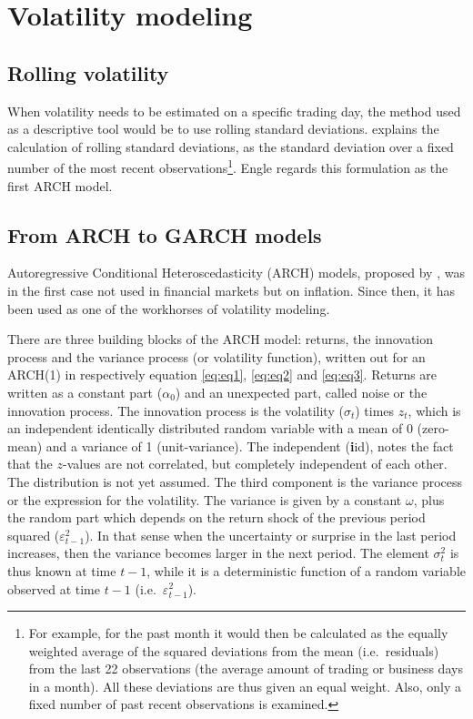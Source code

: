 \documentclass[a4paper, nobind]{templates/ociamthesis}
\begin{document}
\newpage

\hypertarget{vol-mod}{%
\section{Volatility modeling}\label{vol-mod}}

\hypertarget{rolling-volatility}{%
\subsection{Rolling volatility}\label{rolling-volatility}}

\noindent When volatility needs to be estimated on a specific trading day, the method used as a descriptive tool would be to use rolling standard deviations. \textcite{engle2001} explains the calculation of rolling standard deviations, as the standard deviation over a fixed number of the most recent observations\footnote{For example, for the past month it would then be calculated as the equally weighted average of the squared deviations from the mean (i.e.~residuals) from the last 22 observations (the average amount of trading or business days in a month). All these deviations are thus given an equal weight. Also, only a fixed number of past recent observations is examined.}. Engle regards this formulation as the first ARCH model.

\hypertarget{univ-garch}{%
\subsection{From ARCH to GARCH models}\label{univ-garch}}

\noindent Autoregressive Conditional Heteroscedasticity (ARCH) models, proposed by \textcite{engle1982}, was in the first case not used in financial markets but on inflation. Since then, it has been used as one of the workhorses of volatility modeling.

There are three building blocks of the ARCH model: returns, the innovation process and the variance process (or volatility function), written out for an ARCH(1) in respectively equation \eqref{eq:eq1}, \eqref{eq:eq2} and \eqref{eq:eq3}. Returns are written as a constant part (\(\alpha_0\)) and an unexpected part, called noise or the innovation process. The innovation process is the volatility (\(\sigma_t\)) times \(z_t\), which is an independent identically distributed random variable with a mean of 0 (zero-mean) and a variance of 1 (unit-variance). The independent (\textbf{i}id), notes the fact that the \(z\)-values are not correlated, but completely independent of each other. The distribution is not yet assumed. The third component is the variance process or the expression for the volatility. The variance is given by a constant \(\omega\), plus the random part which depends on the return shock of the previous period squared (\(\varepsilon_{t-1}^2\)). In that sense when the uncertainty or surprise in the last period increases, then the variance becomes larger in the next period. The element \(\sigma_t^2\) is thus known at time \(t-1\), while it is a deterministic function of a random variable observed at time \(t-1\) (i.e.~\(\varepsilon_{t-1}^2\)).
\end{document}
